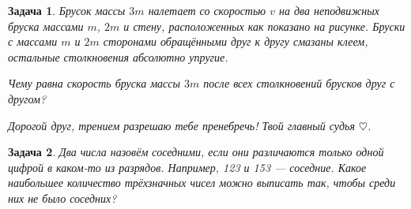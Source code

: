 \documentclass[a4paper, 11pt]{article}
\theoremstyle{break}
\newtheorem{problem}{Задача}[subsection]
\begin{document}
\begin{problem}
Брусок массы $3m$ налетает со скоростью $v$ на два неподвижных бруска массами $m$, $2m$
и стену, расположенных как показано на рисунке. Бруски с массами $m$ и $2m$
сторонами обращёнными друг к другу смазаны клеем, остальные столкновения абсолютно
упругие.

\begin{minipage}{0.8\textwidth}
\begin{center}
\end{center}
\end{minipage}


Чему равна скорость бруска массы $3m$ после всех столкновений брусков друг с другом?

Дорогой друг, трением разрешаю тебе пренебречь! Твой главный судья $\heartsuit$.
\end{problem}


\begin{problem}
Два числа назовём соседними, если они различаются только одной цифрой
в каком-то из разрядов. Например, 123 и 153 — соседние. Какое наибольшее количество
трёхзначных чисел можно выписать так, чтобы среди них не было соседних?
\end{problem}
\end{document}
